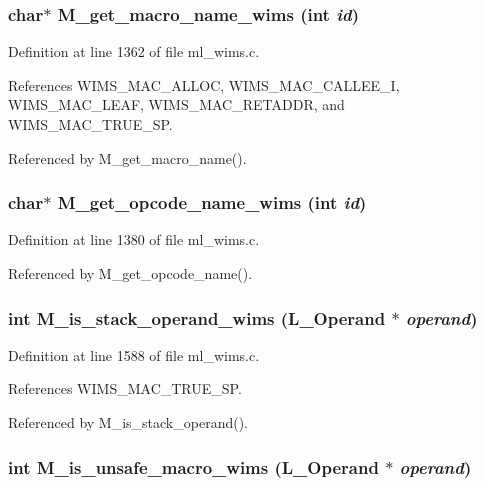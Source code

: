 \subsubsection{\setlength{\rightskip}{0pt plus 5cm}char$\ast$ M\_\-get\_\-macro\_\-name\_\-wims (int {\em id})}\label{ml__wims_8c_05643ee355c8611bde56e54dff741120}




Definition at line 1362 of file ml\_\-wims.c.

References WIMS\_\-MAC\_\-ALLOC, WIMS\_\-MAC\_\-CALLEE\_\-I, WIMS\_\-MAC\_\-LEAF, WIMS\_\-MAC\_\-RETADDR, and WIMS\_\-MAC\_\-TRUE\_\-SP.

Referenced by M\_\-get\_\-macro\_\-name().
\subsubsection{\setlength{\rightskip}{0pt plus 5cm}char$\ast$ M\_\-get\_\-opcode\_\-name\_\-wims (int {\em id})}\label{ml__wims_8c_2e7f9b86291d868dde6d7b542436a637}




Definition at line 1380 of file ml\_\-wims.c.

Referenced by M\_\-get\_\-opcode\_\-name().
\subsubsection{\setlength{\rightskip}{0pt plus 5cm}int M\_\-is\_\-stack\_\-operand\_\-wims (L\_\-Operand $\ast$ {\em operand})}\label{ml__wims_8c_154f51f7c771b787904d21d3292aa29a}




Definition at line 1588 of file ml\_\-wims.c.

References WIMS\_\-MAC\_\-TRUE\_\-SP.

Referenced by M\_\-is\_\-stack\_\-operand().
\subsubsection{\setlength{\rightskip}{0pt plus 5cm}int M\_\-is\_\-unsafe\_\-macro\_\-wims (L\_\-Operand $\ast$ {\em operand})}\label{ml__wims_8c_24594990e1e6ade090136514ef713ae8}




